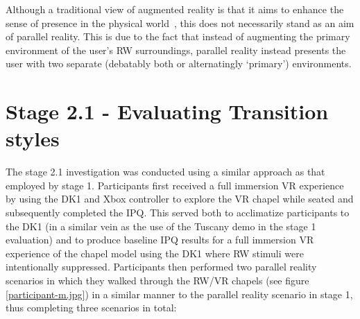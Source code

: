 Although a traditional view of augmented reality is that it aims to enhance the sense of presence in the physical world~\cite{Waterworth2014}, this does not necessarily stand as an aim of parallel reality. This is due to the fact that instead of augmenting the primary environment of the user's RW surroundings, parallel reality instead presents the user with two separate (debatably both or alternatingly `primary') environments.





\section{Stage 2.1 - Evaluating Transition styles}

The stage 2.1 investigation was conducted using a similar approach as that employed by stage 1. Participants first received a full immersion VR experience by using the DK1 and Xbox controller to explore the VR chapel while seated and subsequently completed the IPQ. This served both to acclimatize participants to the DK1 (in a similar vein as the use of the Tuscany demo in the stage 1 evaluation) and to produce baseline IPQ results for a full immersion VR experience of the chapel model using the DK1 where RW stimuli were intentionally suppressed. Participants then performed two parallel reality scenarios in which they walked through the RW/VR chapels (see figure \ref{participant-m.jpg}) in a similar manner to the parallel reality scenario in stage 1, thus completing three scenarios in total:

